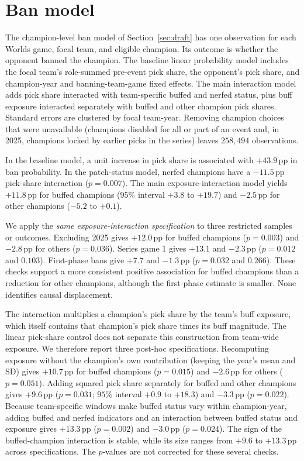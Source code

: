 \documentclass[11pt]{article}
\newcommand{\pp}{\,pp}
\begin{document}
\section{Ban model}
\label{app:bans}
The champion-level ban model of Section~\ref{sec:draft} has one observation for each Worlds game, focal team, and eligible champion. Its outcome is whether the opponent banned the champion. The baseline linear probability model includes the focal team's role-summed pre-event pick share, the opponent's pick share, and champion-year and banning-team-game fixed effects. The main interaction model adds pick share interacted with team-specific buffed and nerfed status, plus buff exposure interacted separately with buffed and other champion pick shares. Standard errors are clustered by focal team-year. Removing champion choices that were unavailable (champions disabled for all or part of an event and, in 2025, champions locked by earlier picks in the series) leaves $258{,}494$ observations.

In the baseline model, a unit increase in pick share is associated with $+43.9$\pp{} in ban probability. In the patch-status model, nerfed champions have a $-11.5$\pp{} pick-share interaction ($p = 0.007$). The main exposure-interaction model yields $+11.8$\pp{} for buffed champions ($95\%$ interval $+3.8$ to $+19.7$) and $-2.5$\pp{} for other champions ($-5.2$ to $+0.1$).

We apply the \emph{same exposure-interaction specification} to three restricted samples or outcomes. Excluding 2025 gives $+12.0$\pp{} for buffed champions ($p = 0.003$) and $-2.8$\pp{} for others ($p = 0.036$). Series game 1 gives $+13.1$ and $-2.3$\pp{} ($p = 0.012$ and $0.103$). First-phase bans give $+7.7$ and $-1.3$\pp{} ($p = 0.032$ and $0.266$). These checks support a more consistent positive association for buffed champions than a reduction for other champions, although the first-phase estimate is smaller. None identifies causal displacement.

The interaction multiplies a champion's pick share by the team's buff exposure, which itself contains that champion's pick share times its buff magnitude. The linear pick-share control does not separate this construction from team-wide exposure. We therefore report three post-hoc specifications. Recomputing exposure without the champion's own contribution (keeping the year's mean and SD) gives $+10.7$\pp{} for buffed champions ($p = 0.015$) and $-2.6$\pp{} for others ($p = 0.051$). Adding squared pick share separately for buffed and other champions gives $+9.6$\pp{} ($p = 0.031$; $95\%$ interval $+0.9$ to $+18.3$) and $-3.3$\pp{} ($p = 0.022$). Because team-specific windows make buffed status vary within champion-year, adding buffed and nerfed indicators and an interaction between buffed status and exposure gives $+13.3$\pp{} ($p = 0.002$) and $-3.0$\pp{} ($p = 0.024$). The sign of the buffed-champion interaction is stable, while its size ranges from $+9.6$ to $+13.3$\pp{} across specifications. The $p$-values are not corrected for these several checks.
\end{document}
